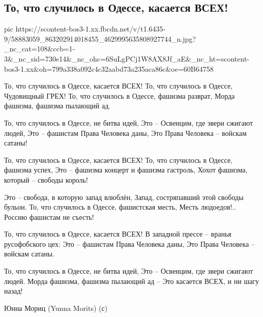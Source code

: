  
 
 
 
 

\subsection{То, что случилось в Одессе, касается ВСЕХ!}

\ifcmt
  pic https://scontent-bos3-1.xx.fbcdn.net/v/t1.6435-9/58883059_863202914018455_4629995635808927744_n.jpg?_nc_cat=108&ccb=1-3&_nc_sid=730e14&_nc_ohc=6SuLgPCj1W8AX8Jf_aE&_nc_ht=scontent-bos3-1.xx&oh=799a338a092c4c32aabd73a235aca86c&oe=60B64758
\fi

То, что случилось в Одессе, касается ВСЕХ!
То, что случилось в Одессе, Чудовищный ГРЕХ!
То, что случилось в Одессе, фашизма разврат,
Морда фашизма, фашизма пылающий ад.

То, что случилось в Одессе, не битва идей,
Это – Освенцим, где звери сжигают людей,
Это – фашистам Права Человека даны,
Это Права Человека – войскам сатаны!

То, что случилось в Одессе, касается ВСЕХ!
То, что случилось в Одессе, фашизма успех,
Это – фашизма концерт и фашизма гастроль,
Хохот фашизма, который – свободы король!

Это – свобода, в которую запад влюблён,
Запад, состряпавший этой свободы бульон.
То, что случилось в Одессе, фашистская месть,
Месть людоедов!.. Россию фашистам не съесть!

То, что случилось в Одессе, касается ВСЕХ!
В западной прессе – вранья русофобского цех:
Это – фашистам Права Человека даны,
Это Права Человека – войскам сатаны.

То, что случилось в Одессе, не битва идей,
Это – Освенцим, где звери сжигают людей.
Морда фашизма, фашизма пылающий ад –
Это касается ВСЕХ, и ни шагу назад!

Юнна Мориц (Yunna Morits) (с)
